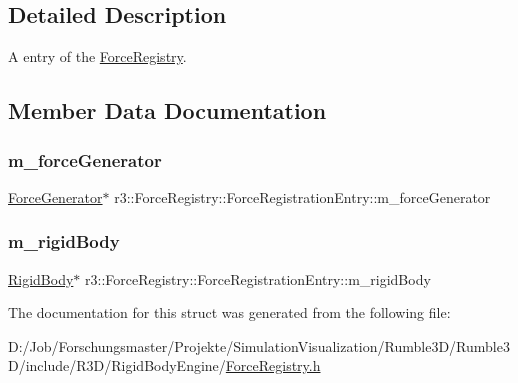 \subsection{Detailed Description}
A entry of the \mbox{\hyperlink{classr3_1_1_force_registry}{Force\+Registry}}. 

\subsection{Member Data Documentation}
\mbox{\label{structr3_1_1_force_registry_1_1_force_registration_entry_aa2af182d8c92d8da8d6045ea4f4a5e16}} 
\subsubsection{\texorpdfstring{m\+\_\+force\+Generator}{m\_forceGenerator}}
{\footnotesize\ttfamily \mbox{\hyperlink{classr3_1_1_force_generator}{Force\+Generator}}$\ast$ r3\+::\+Force\+Registry\+::\+Force\+Registration\+Entry\+::m\+\_\+force\+Generator}

\mbox{\label{structr3_1_1_force_registry_1_1_force_registration_entry_a103ff58c0c8f46f2ed1927976bc5dc87}} 
\subsubsection{\texorpdfstring{m\+\_\+rigid\+Body}{m\_rigidBody}}
{\footnotesize\ttfamily \mbox{\hyperlink{classr3_1_1_rigid_body}{Rigid\+Body}}$\ast$ r3\+::\+Force\+Registry\+::\+Force\+Registration\+Entry\+::m\+\_\+rigid\+Body}



The documentation for this struct was generated from the following file\+:\begin{DoxyCompactItemize}
\item 
D\+:/\+Job/\+Forschungsmaster/\+Projekte/\+Simulation\+Visualization/\+Rumble3\+D/\+Rumble3\+D/include/\+R3\+D/\+Rigid\+Body\+Engine/\mbox{\hyperlink{_force_registry_8h}{Force\+Registry.\+h}}\end{DoxyCompactItemize}
